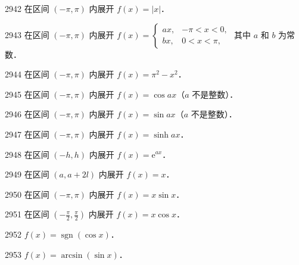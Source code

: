 \begin{prob}[S]{2942}
在区间 $(-\pi, \pi)$ 内展开 $f(x) = |x|$．
\end{prob}

\begin{prob}[M]{2943}
在区间 $(-\pi, \pi)$ 内展开 $f(x) = \begin{cases} ax, & -\pi < x < 0, \\ bx, & 0 < x < \pi, \end{cases}$ 其中 $a$ 和 $b$ 为常数．
\end{prob}

\begin{prob}[S]{2944}
在区间 $(-\pi, \pi)$ 内展开 $f(x) = \pi^2 - x^2$．
\end{prob}

\begin{prob}[S]{2945}
在区间 $(-\pi, \pi)$ 内展开 $f(x) = \cos ax$（$a$ 不是整数）．
\end{prob}

\begin{prob}[S]{2946}
在区间 $(-\pi, \pi)$ 内展开 $f(x) = \sin ax$（$a$ 不是整数）．
\end{prob}

\begin{prob}[S]{2947}
在区间 $(-\pi, \pi)$ 内展开 $f(x) = \sinh ax$．
\end{prob}

\begin{prob}[S]{2948}
在区间 $(-h, h)$ 内展开 $f(x) = \mathrm{e}^{ax}$．
\end{prob}

\begin{prob}[S]{2949}
在区间 $(a, a + 2l)$ 内展开 $f(x) = x$．
\end{prob}

\begin{prob}[S]{2950}
在区间 $(-\pi, \pi)$ 内展开 $f(x) = x \sin x$．
\end{prob}

\begin{prob}[S]{2951}
在区间 $\left(-\frac{\pi}{2}, \frac{\pi}{2}\right)$ 内展开 $f(x) = x \cos x$．
\end{prob}


\begin{prob}[S]{2952}
$f(x) = \operatorname{sgn}(\cos x)$．
\end{prob}

\begin{prob}[S]{2953}
$f(x) = \arcsin(\sin x)$．
\end{prob}

